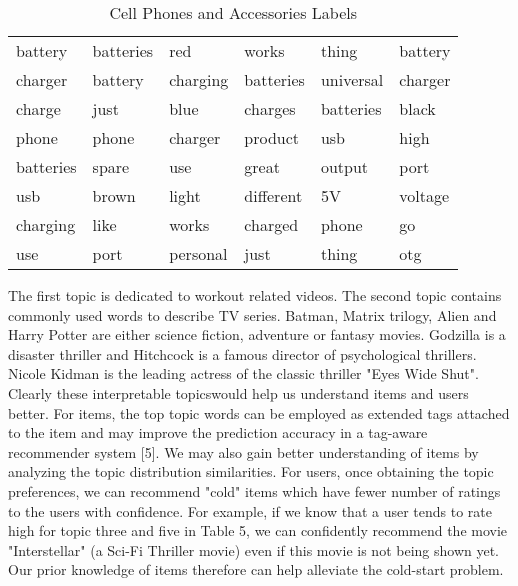 \documentclass[10pt,conference]{IEEEtran}
\begin{document}
\begin{table}[h]
\centering
\caption{Cell Phones and Accessories Labels}
\label{Cell Phones and Accessories Labels}
\begin{tabular}{ llllll }
\toprule
battery & batteries & red   & works  & thing & battery \\
charger & battery & charging & batteries & universal & charger \\
charge & just & blue & charges & batteries & black \\ 
phone & phone & charger & product & usb & high\\ 
batteries & spare & use  & great & output & port \\ 
usb & brown & light & different & 5V & voltage \\ 
charging & like & works & charged & phone & go\\ 
use & port & personal & just & thing & otg \\ 
\toprule          
\end{tabular}
\end{table}

The first topic is dedicated to workout related videos. The second topic contains commonly used words to describe TV series. Batman, Matrix trilogy, Alien and Harry Potter are either science fiction, adventure or fantasy movies. Godzilla is a disaster thriller and Hitchcock is a famous director of psychological thrillers. Nicole Kidman is the leading actress of the classic thriller "Eyes Wide Shut". Clearly these interpretable topicswould help us understand items and users better. For items, the top topic words can be employed as extended tags attached to the item and may improve the prediction accuracy in a tag-aware recommender system [5]. We may also gain better understanding of items by analyzing the topic distribution similarities. For users, once obtaining the topic preferences, we can recommend "cold" items which have fewer number of ratings to the users with confidence. For example, if we know that a user tends to rate high for topic three and five in Table 5, we can confidently recommend the movie "Interstellar" (a Sci-Fi Thriller movie) even if this movie is not being shown yet. Our prior knowledge of items therefore can help alleviate the cold-start problem.



\end{document}
